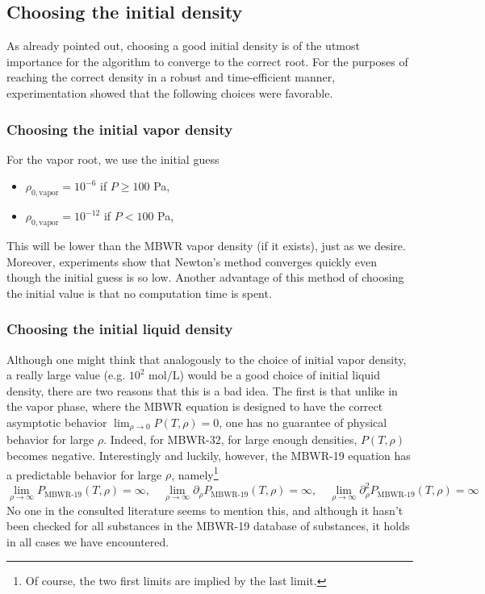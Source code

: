 \documentclass[english]{../thermomemo/thermomemo}
\numberwithin{equation}{section}
\begin{document}
\subsection{Choosing the initial density} \label{sec:inDens}
As already pointed out, choosing a good initial density is of the utmost
importance for the algorithm to converge to the correct root. For the purposes of reaching the correct density in a robust and time-efficient manner, experimentation showed that the following choices were favorable.

\subsubsection*{Choosing the initial vapor density}
For the vapor root, we use the initial guess 
\begin{itemize}
\item $\rho_{0,\text{vapor}} = 10^{-6}$ if $P \ge 100$ Pa,
\item $\rho_{0,\text{vapor}} = 10^{-12}$ if $P<100$ Pa,
\end{itemize}
This will be lower than the MBWR vapor density (if it exists), just as we desire. Moreover, experiments show that Newton's method converges quickly even though the initial guess is so low. Another advantage of this method of choosing the initial value is that no computation time is spent.

\subsubsection*{Choosing the initial liquid density}
Although one might think that analogously to the choice of initial
vapor density, a really large value (e.g. $10^{2}$
$\mathrm{mol}/\mathrm{L}$) would be a good choice of initial liquid
density, there are two reasons that this is a bad idea. The first is
that unlike in the vapor phase, where the MBWR equation is designed to
have the correct asymptotic behavior $\lim_{\rho \to 0} P(T,\rho) = 0$, one has no guarantee of physical behavior for large $\rho$. Indeed, for MBWR-32, for large enough densities, $P(T,\rho)$ becomes negative. Interestingly and luckily, however, the MBWR-19 equation has a predictable behavior for large $\rho$, namely\footnote{Of course, the two first limits are implied by the last limit.}
$$
\lim_{\rho \to \infty} P_{\text{MBWR-}19}(T,\rho) = \infty,
\quad \lim_{\rho \to \infty} \partial_\rho
P_{\text{MBWR-}19}(T,\rho) = \infty, \quad \lim_{\rho \to \infty} \partial^2_\rho P_{\text{MBWR-}19}(T,\rho) = \infty
$$
No one in the consulted literature seems to mention this, and although it hasn't been checked for all substances in the MBWR-19 database of substances, it holds in all cases we have encountered.
\end{document}
